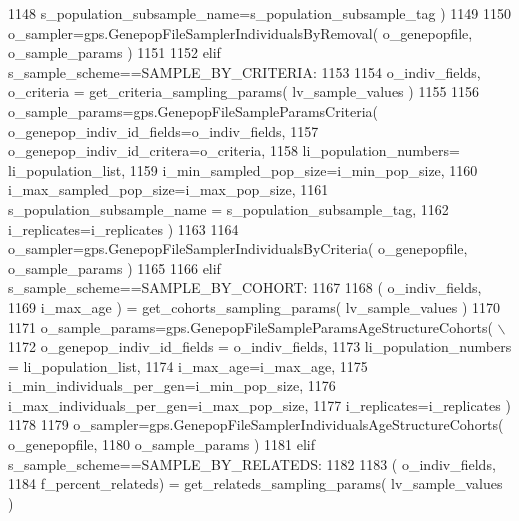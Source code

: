 \begin{DoxyCode}
1148                                                 s\_population\_subsample\_name=s\_population\_subsample\_tag )
1149 
1150         o\_sampler=gps.GenepopFileSamplerIndividualsByRemoval( o\_genepopfile, o\_sample\_params )
1151 
1152     \textcolor{keywordflow}{elif} s\_sample\_scheme==SAMPLE\_BY\_CRITERIA:
1153 
1154         o\_indiv\_fields, o\_criteria = get\_criteria\_sampling\_params( lv\_sample\_values )
1155 
1156         o\_sample\_params=gps.GenepopFileSampleParamsCriteria( o\_genepop\_indiv\_id\_fields=o\_indiv\_fields,
1157                                                                     o\_genepop\_indiv\_id\_critera=o\_criteria,
1158                                                                     li\_population\_numbers=
      li\_population\_list,
1159                                                                     i\_min\_sampled\_pop\_size=i\_min\_pop\_size,
1160                                                                     i\_max\_sampled\_pop\_size=i\_max\_pop\_size,
1161                                                                     s\_population\_subsample\_name = 
      s\_population\_subsample\_tag,
1162                                                                     i\_replicates=i\_replicates )
1163 
1164         o\_sampler=gps.GenepopFileSamplerIndividualsByCriteria( o\_genepopfile, o\_sample\_params )
1165 
1166     \textcolor{keywordflow}{elif} s\_sample\_scheme==SAMPLE\_BY\_COHORT:
1167 
1168         ( o\_indiv\_fields,
1169             i\_max\_age ) = get\_cohorts\_sampling\_params( lv\_sample\_values )
1170 
1171         o\_sample\_params=gps.GenepopFileSampleParamsAgeStructureCohorts( \(\backslash\)
1172                                         o\_genepop\_indiv\_id\_fields = o\_indiv\_fields,
1173                                         li\_population\_numbers = li\_population\_list,
1174                                         i\_max\_age=i\_max\_age,
1175                                         i\_min\_individuals\_per\_gen=i\_min\_pop\_size,
1176                                         i\_max\_individuals\_per\_gen=i\_max\_pop\_size,
1177                                         i\_replicates=i\_replicates )
1178 
1179         o\_sampler=gps.GenepopFileSamplerIndividualsAgeStructureCohorts( o\_genepopfile,
1180                                                                     o\_sample\_params )
1181     \textcolor{keywordflow}{elif} s\_sample\_scheme==SAMPLE\_BY\_RELATEDS:
1182 
1183             ( o\_indiv\_fields,
1184                 f\_percent\_relateds) = get\_relateds\_sampling\_params( lv\_sample\_values )

\end{DoxyCode}
